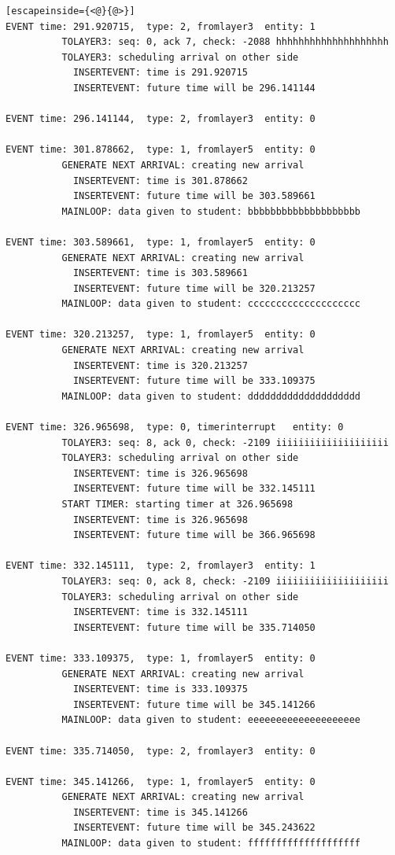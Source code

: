 \documentclass[paper=a4, fontsize=11pt]{scrartcl}
\numberwithin{equation}{section}		%
\numberwithin{figure}{section}			%
\numberwithin{table}{section}				%
\begin{document}
\begin{lstlisting}[escapeinside={<@}{@>}]
EVENT time: 291.920715,  type: 2, fromlayer3  entity: 1
          TOLAYER3: seq: 0, ack 7, check: -2088 hhhhhhhhhhhhhhhhhhhh
          TOLAYER3: scheduling arrival on other side
            INSERTEVENT: time is 291.920715
            INSERTEVENT: future time will be 296.141144

EVENT time: 296.141144,  type: 2, fromlayer3  entity: 0

EVENT time: 301.878662,  type: 1, fromlayer5  entity: 0
          GENERATE NEXT ARRIVAL: creating new arrival
            INSERTEVENT: time is 301.878662
            INSERTEVENT: future time will be 303.589661
          MAINLOOP: data given to student: bbbbbbbbbbbbbbbbbbbb

EVENT time: 303.589661,  type: 1, fromlayer5  entity: 0
          GENERATE NEXT ARRIVAL: creating new arrival
            INSERTEVENT: time is 303.589661
            INSERTEVENT: future time will be 320.213257
          MAINLOOP: data given to student: cccccccccccccccccccc

EVENT time: 320.213257,  type: 1, fromlayer5  entity: 0
          GENERATE NEXT ARRIVAL: creating new arrival
            INSERTEVENT: time is 320.213257
            INSERTEVENT: future time will be 333.109375
          MAINLOOP: data given to student: dddddddddddddddddddd

EVENT time: 326.965698,  type: 0, timerinterrupt   entity: 0
          TOLAYER3: seq: 8, ack 0, check: -2109 iiiiiiiiiiiiiiiiiiii
          TOLAYER3: scheduling arrival on other side
            INSERTEVENT: time is 326.965698
            INSERTEVENT: future time will be 332.145111
          START TIMER: starting timer at 326.965698
            INSERTEVENT: time is 326.965698
            INSERTEVENT: future time will be 366.965698

EVENT time: 332.145111,  type: 2, fromlayer3  entity: 1
          TOLAYER3: seq: 0, ack 8, check: -2109 iiiiiiiiiiiiiiiiiiii
          TOLAYER3: scheduling arrival on other side
            INSERTEVENT: time is 332.145111
            INSERTEVENT: future time will be 335.714050

EVENT time: 333.109375,  type: 1, fromlayer5  entity: 0
          GENERATE NEXT ARRIVAL: creating new arrival
            INSERTEVENT: time is 333.109375
            INSERTEVENT: future time will be 345.141266
          MAINLOOP: data given to student: eeeeeeeeeeeeeeeeeeee

EVENT time: 335.714050,  type: 2, fromlayer3  entity: 0

EVENT time: 345.141266,  type: 1, fromlayer5  entity: 0
          GENERATE NEXT ARRIVAL: creating new arrival
            INSERTEVENT: time is 345.141266
            INSERTEVENT: future time will be 345.243622
          MAINLOOP: data given to student: ffffffffffffffffffff


\end{lstlisting}
\end{document}
